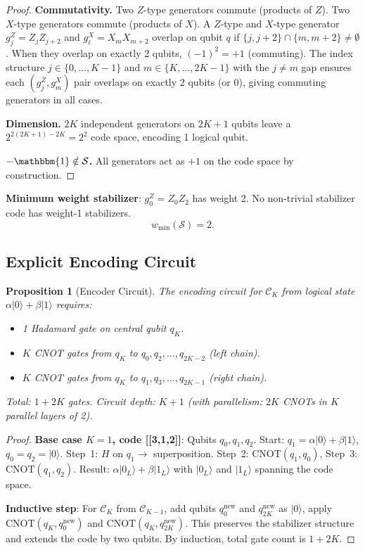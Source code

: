 \documentclass[11pt]{article}
\newtheorem{proposition}[theorem]{Proposition}
\theoremstyle{definition}
\theoremstyle{remark}
\begin{document}
\begin{proof}
\textbf{Commutativity.}  Two $Z$-type generators commute (products of $Z$).
Two $X$-type generators commute (products of $X$).  A $Z$-type and $X$-type
generator $g_j^Z = Z_j Z_{j+2}$ and $g_\ell^X = X_m X_{m+2}$ overlap on
qubit $q$ if $\{j,j+2\}\cap\{m,m+2\}\neq\emptyset$.  When they overlap on
exactly 2 qubits, $(-1)^2 = +1$ (commuting).  The index structure $j\in
\{0,\ldots,K-1\}$ and $m\in\{K,\ldots,2K-1\}$ with the $j\neq m$ gap
ensures each $(g_j^Z, g_m^X)$ pair overlaps on exactly 2 qubits (or 0),
giving commuting generators in all cases.

\textbf{Dimension.}  $2K$ independent generators on $2K+1$ qubits leave
a $2^{2(2K+1)-2K} = 2^{2}$ code space, encoding 1 logical qubit.

\textbf{$-\mathbbm{1}\notin\mathcal{S}$.}  All generators act as $+1$
on the code space by construction.
\end{proof}

\textbf{Minimum weight stabilizer}: $g_0^Z = Z_0 Z_2$ has weight 2.
No non-trivial stabilizer code has weight-1 stabilizers.
\begin{equation}
  \boxed{w_{\min}(\mathcal{S}) = 2.}
\end{equation}

\subsection{Explicit Encoding Circuit}

\begin{proposition}[Encoder Circuit]
\label{prop:encoder}
The encoding circuit for $\mathcal{C}_K$ from logical state
$\alpha|0\rangle + \beta|1\rangle$ requires:
\begin{itemize}
  \item 1 Hadamard gate on central qubit $q_K$.
  \item $K$ CNOT gates from $q_K$ to $q_0, q_2, \ldots, q_{2K-2}$ (left chain).
  \item $K$ CNOT gates from $q_K$ to $q_1, q_3, \ldots, q_{2K-1}$ (right chain).
\end{itemize}
Total: $1 + 2K$ gates.  Circuit depth: $K+1$ (with parallelism: $2K$ CNOTs
in $K$ parallel layers of 2).
\end{proposition}

\begin{proof}
\textbf{Base case $K=1$, code [[3,1,2]]}: Qubits $q_0, q_1, q_2$.
Start: $q_1 = \alpha|0\rangle + \beta|1\rangle$, $q_0 = q_2 = |0\rangle$.
Step~1: $H$ on $q_1 \to$ superposition.
Step~2: $\mathrm{CNOT}(q_1, q_0)$, Step~3: $\mathrm{CNOT}(q_1, q_2)$.
Result: $\alpha|0_L\rangle + \beta|1_L\rangle$ with $|0_L\rangle$ and
$|1_L\rangle$ spanning the code space.

\textbf{Inductive step}: For $\mathcal{C}_{K}$ from $\mathcal{C}_{K-1}$,
add qubits $q_0^{\mathrm{new}}$ and $q_{2K}^{\mathrm{new}}$ as $|0\rangle$,
apply $\mathrm{CNOT}(q_K, q_0^{\mathrm{new}})$ and
$\mathrm{CNOT}(q_K, q_{2K}^{\mathrm{new}})$.  This preserves the stabilizer
structure and extends the code by two qubits.  By induction, total gate
count is $1 + 2K$.
\end{proof}
\end{document}
